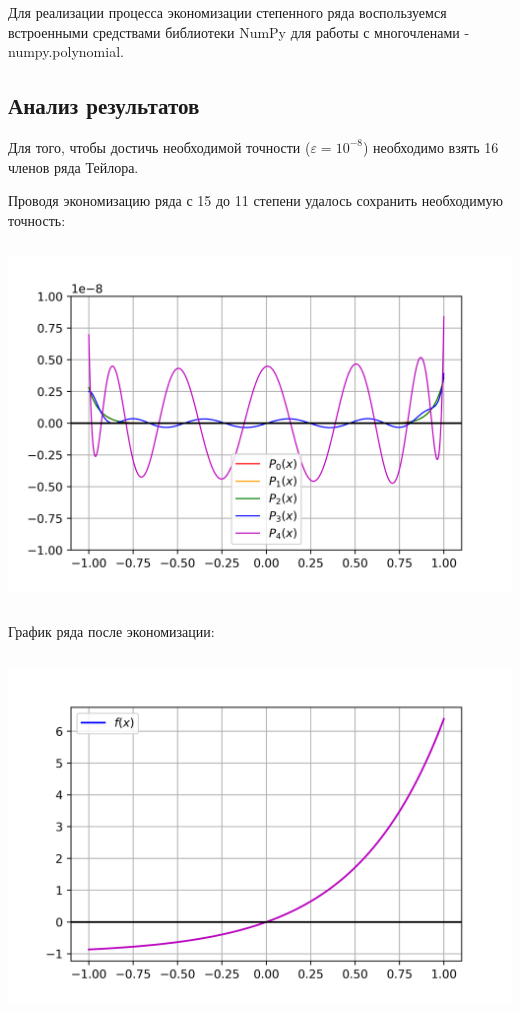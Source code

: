 Для реализации процесса экономизации степенного ряда воспользуемся встроенными средствами библиотеки NumPy для работы с многочленами - numpy.polynomial.

\subsection*{Анализ результатов}
Для того, чтобы достичь необходимой точности ($\varepsilon = 10^{-8}$) необходимо взять 16 членов ряда Тейлора.

Проводя экономизацию ряда с 15 до 11 степени удалось сохранить необходимую точность:

\includegraphics[height=9.5cm]{plot_4.3_err.png}

График ряда после экономизации:

\includegraphics[height=9.5cm]{plot_4.3_func.png}
